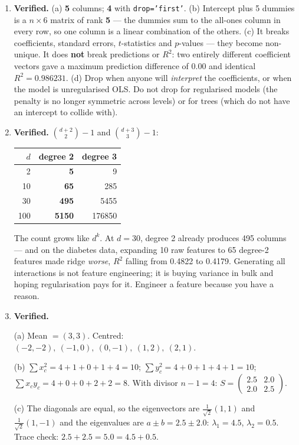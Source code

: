 \documentclass[11pt,a4paper]{article}
\newcommand{\A}[1]{\item[\textbf{#1}]}
\begin{document}
\begin{enumerate}[leftmargin=1.9cm]
\A{U4.66} \textbf{Verified.} (a) \textbf{5} columns; \textbf{4} with
\texttt{drop='first'}. (b) Intercept plus 5 dummies is a $n\times6$ matrix of
rank \textbf{5} --- the dummies sum to the all-ones column in every row, so one
column is a linear combination of the others. (c) It breaks coefficients,
standard errors, $t$-statistics and $p$-values --- they become non-unique. It
does \textbf{not} break predictions or $R^2$: two entirely different coefficient
vectors gave a maximum prediction difference of 0.00 and identical
$R^2 = 0.986231$. (d) Drop when anyone will \emph{interpret} the coefficients,
or when the model is unregularised OLS. Do not drop for regularised models
(the penalty is no longer symmetric across levels) or for trees (which do not
have an intercept to collide with).

\A{U4.67} \textbf{Verified.} $\binom{d+2}{2}-1$ and $\binom{d+3}{3}-1$:
\begin{center}\begin{tabular}{@{}rrr@{}}\toprule
$d$ & degree 2 & degree 3\\
\midrule
2 & \textbf{5} & 9\\ 10 & \textbf{65} & 285\\ 30 & \textbf{495} & 5455\\
100 & \textbf{5150} & 176850\\
\bottomrule\end{tabular}\end{center}
The count grows like $d^k$. At $d = 30$, degree 2 already produces 495 columns
--- and on the diabetes data, expanding 10 raw features to 65 degree-2 features
made ridge \emph{worse}, $R^2$ falling from 0.4822 to 0.4179. Generating all
interactions is not feature engineering; it is buying variance in bulk and
hoping regularisation pays for it. Engineer a feature because you have a reason.

\A{U4.68} \textbf{Verified.}
\begin{answerbox}
(a) Mean $= (3,3)$. Centred:
$(-2,-2),\ (-1,0),\ (0,-1),\ (1,2),\ (2,1)$.

(b) $\sum x_c^2 = 4+1+0+1+4 = 10$; $\sum y_c^2 = 4+0+1+4+1 = 10$;
$\sum x_cy_c = 4+0+0+2+2 = 8$. With divisor $n-1 = 4$:
$S = \begin{pmatrix} 2.5 & 2.0\\ 2.0 & 2.5\end{pmatrix}$.

(c) The diagonals are equal, so the eigenvectors are
$\frac{1}{\sqrt2}(1,1)$ and $\frac{1}{\sqrt2}(1,-1)$ and the eigenvalues are
$a \pm b = 2.5 \pm 2.0$: $\lambda_1 = \mathbf{4.5}$,
$\lambda_2 = \mathbf{0.5}$. Trace check: $2.5 + 2.5 = 5.0 = 4.5 + 0.5$.
\checkmark


\end{answerbox}
\end{enumerate}
\end{document}

